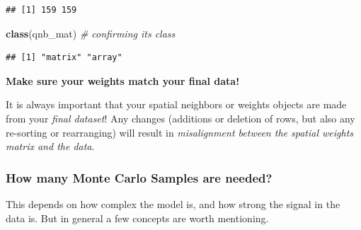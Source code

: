 \documentclass[
]{book}
\newenvironment{Shaded}{\begin{snugshade}}{\end{snugshade}}
\newcommand{\CommentTok}[1]{\textcolor[rgb]{0.56,0.35,0.01}{\textit{#1}}}
\newcommand{\FunctionTok}[1]{\textcolor[rgb]{0.13,0.29,0.53}{\textbf{#1}}}
\newcommand{\NormalTok}[1]{#1}
\newenvironment{rmdcaution}[1]
  {
  \begin{itemize}
  \renewcommand{\labelitemi}{
    \raisebox{-.7\height}[0pt][0pt]{
      {\setkeys{Gin}{width=3em,keepaspectratio}\texttt{[image: images/\#1]}}
    }
  }
  \setlength{\fboxsep}{1em}
  \begin{caution}
  \item
  }
  {
  \end{caution}
  \end{itemize}
  }
\begin{document}
\begin{verbatim}
## [1] 159 159
\end{verbatim}

\begin{Shaded}
\begin{Highlighting}[]
\FunctionTok{class}\NormalTok{(qnb\_mat) }\CommentTok{\# confirming its class}
\end{Highlighting}
\end{Shaded}

\begin{verbatim}
## [1] "matrix" "array"
\end{verbatim}

\begin{rmdcaution}{caution}
\textbf{Make sure your weights match your final data!}

It is always important that your spatial neighbors or weights objects are made from your \emph{final dataset}! Any changes (additions or deletion of rows, but also any re-sorting or rearranging) will result in \emph{misalignment between the spatial weights matrix and the data}.

\end{rmdcaution}

\hypertarget{how-many-monte-carlo-samples-are-needed}{%
\subsubsection{How many Monte Carlo Samples are needed?}\label{how-many-monte-carlo-samples-are-needed}}

This depends on how complex the model is, and how strong the signal in the data is. But in general a few concepts are worth mentioning.
\end{document}
